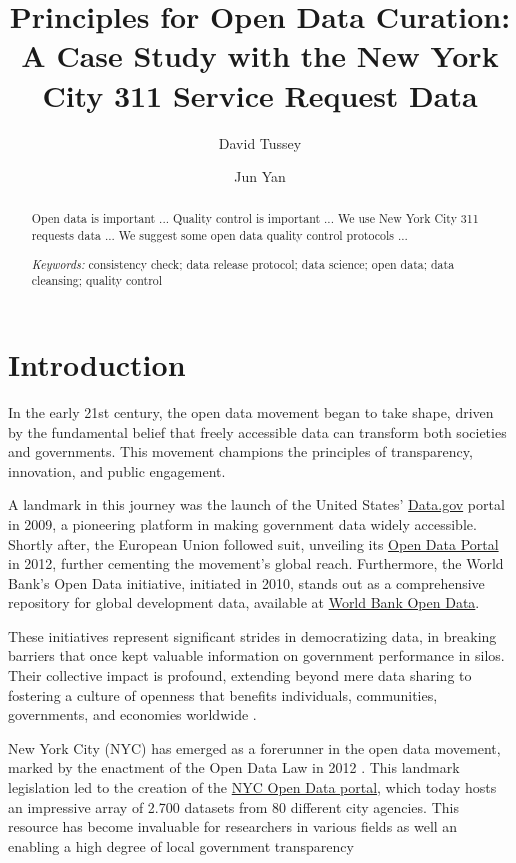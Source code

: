 \documentclass[12pt, titlepage]{article}
\title{Principles for Open Data Curation: A Case Study with the New
  York City 311 Service Request Data}
\author[1]{David Tussey}
\author[2]{Jun Yan}
\affil[1]{Former Executive Director, NYC DoITT}
\affil[2]{Department of Statistics, University of Connecticut}
\begin{document}
\maketitle

\tableofcontents %
\listoffigures %
\listoftables %


\begin{abstract}
  Open data is important ...
  Quality control is important ...
  We use New York City 311 requests data  ...
  We suggest some open data quality control protocols ...


\bigskip
  
\noindent
{\it Keywords:}
consistency check;    
data release protocol;
data science;
open data;
data cleansing;
quality control	
\end{abstract}

\doublespacing

\section{Introduction} \label{sec:intro}

In the early 21st century, the open data movement began to take shape, driven by the 
fundamental belief that freely accessible data can transform 
both societies and governments. This movement champions the principles of 
transparency, innovation, and public engagement. 

A landmark in this journey was the launch of the United States'
\href{https://www.data.gov}{Data.gov} portal in 2009, a pioneering
platform in making government data widely accessible. Shortly after,
the European Union followed suit, unveiling its
\href{https://data.europa.eu/euodp}{Open Data Portal} in 2012, further
cementing the movement's global reach. Furthermore, the World Bank's Open
Data initiative, initiated in 2010, stands out as a comprehensive
repository for global development data, available at
\href{https://data.worldbank.org}{World Bank Open Data}. 

These initiatives represent significant strides in democratizing data, in breaking barriers that once
kept valuable information on government performance in silos. Their collective impact is profound, extending beyond
mere data sharing to fostering a culture of openness that benefits
individuals, communities, governments, and economies worldwide
\citep{barns2016mine, wang2016adoption}.

New York City (NYC) has emerged as a forerunner in the open data
movement, marked by the enactment of the Open Data Law in 2012
\citep{zuiderwijk2014open}. This landmark legislation led to the
creation of the \href{https://opendata.cityofnewyork.us}{NYC Open Data
  portal}, which today hosts an impressive array of 2.700 datasets
from 80 different city agencies. This resource has become invaluable
for researchers in various fields as well an enabling a high degree of local government transparency
\end{document}
